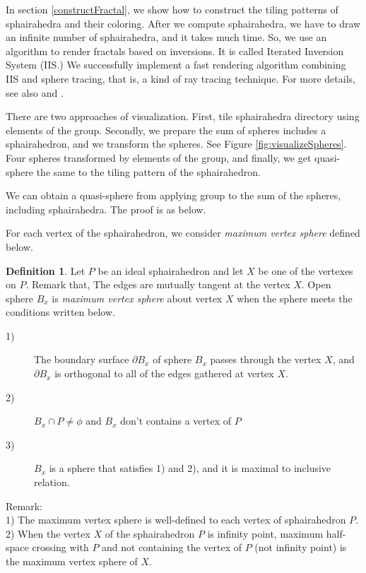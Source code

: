 \documentclass[suppldata, dvipdfmx]{interact}
\theoremstyle{plain}%
\theoremstyle{definition}
\newtheorem{definition}[theorem]{Definition}
\theoremstyle{remark}
\theoremstyle{problemstyle}
\begin{document}
In section \ref{constructFractal}, we show how to construct the tiling
patterns of sphairahedra and their coloring.
After we compute sphairahedra, we have to draw an infinite number of
sphairahedra, and it takes much time.
So, we use an algorithm to render fractals based on
inversions. It is called Iterated Inversion System (IIS.)
We successfully implement a fast rendering algorithm
combining IIS and sphere tracing, that is, a kind of ray tracing technique.
For more details, see also \cite{bridges2017} and \cite{bridges2018}.

There are two approaches of visualization.
First, tile sphairahedra directory using elements of the group.
Secondly, we prepare the sum of spheres includes a sphairahedron, and we
transform the spheres.
See Figure \ref{fig:visualizeSpheres}.
Four spheres transformed by elements of the group, and finally, we get
quasi-sphere the same to the tiling pattern of the sphairahedron.

We can obtain a quasi-sphere from applying group to the sum of the spheres,
including sphairahedra. The proof is as below.

For each vertex of the sphairahedron, we consider \textit{maximum vertex
sphere} defined below.

\begin{definition}
 Let $P$ be an ideal sphairahedron and let $X$ be one of the vertexes on $P$.
 Remark that, The edges are mutually tangent at the vertex $X$.
 Open sphere $B_x$ is \textit{maximum vertex sphere} about vertex $X$ when the sphere
 meets the conditions written below.

 \begin{description}
  \item[1)] The boundary surface $\partial B_x$ of sphere $B_x$ passes through
             the vertex $X$, and $\partial B_x$ is orthogonal to all of the
             edges gathered at vertex $X$.
  \item[2)] $B_x \cap P \neq \phi$ and $B_x$ don't contains a vertex of
             $P$
  \item[3)] $B_x$ is a sphere that satisfies 1) and 2), and it is
             maximal to inclusive relation.
 \end{description}
\end{definition}

Remark: \\
1) The maximum vertex sphere is well-defined to each vertex of sphairahedron
$P$.\\
2) When the vertex $X$ of the sphairahedron $P$ is infinity point,
 maximum half-space crossing with $P$ and not containing the vertex of
 $P$ (not infinity point)
 is the maximum vertex sphere of $X$.
\end{document}
